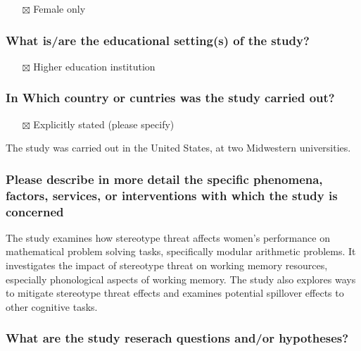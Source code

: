 \documentclass[
  doc, a4paper]{apa7}
\providecommand{\tightlist}{%
  \setlength{\itemsep}{0pt}\setlength{\parskip}{0pt}}
\begin{document}
\begin{itemize}
\tightlist
\item[$\boxtimes$]
  Female only
\end{itemize}

\subsubsection{What is/are the educational setting(s) of the study?}\label{what-isare-the-educational-settings-of-the-study}

\begin{itemize}
\tightlist
\item[$\boxtimes$]
  Higher education institution
\end{itemize}

\subsubsection{In Which country or cuntries was the study carried out?}\label{in-which-country-or-cuntries-was-the-study-carried-out}

\begin{itemize}
\tightlist
\item[$\boxtimes$]
  Explicitly stated (please specify)
\end{itemize}

The study was carried out in the United States, at two Midwestern universities.

\subsubsection{Please describe in more detail the specific phenomena, factors, services, or interventions with which the study is concerned}\label{please-describe-in-more-detail-the-specific-phenomena-factors-services-or-interventions-with-which-the-study-is-concerned}

The study examines how stereotype threat affects women's performance on mathematical problem solving tasks, specifically modular arithmetic problems. It investigates the impact of stereotype threat on working memory resources, especially phonological aspects of working memory. The study also explores ways to mitigate stereotype threat effects and examines potential spillover effects to other cognitive tasks.

\subsubsection{What are the study reserach questions and/or hypotheses?}\label{what-are-the-study-reserach-questions-andor-hypotheses}
\end{document}
